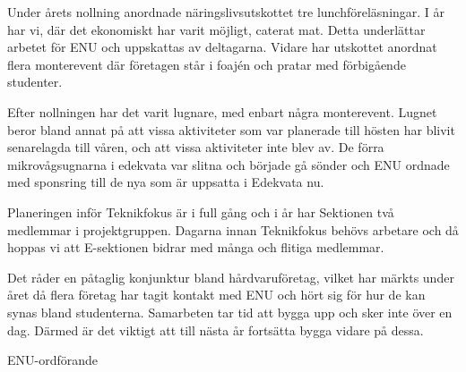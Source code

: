 \documentclass[../_main/handlingar.tex]{subfiles}
\begin{document}

Under årets nollning anordnade näringslivsutskottet tre lunchföreläsningar. I år har vi, där det ekonomiskt har varit möjligt, caterat mat. Detta underlättar arbetet för ENU och uppskattas av deltagarna. Vidare har utskottet anordnat flera monterevent där företagen står i foajén och pratar med förbigående studenter.

Efter nollningen har det varit lugnare, med enbart några monterevent. Lugnet beror bland annat på att vissa aktiviteter som var planerade till hösten har blivit senarelagda till våren, och att vissa aktiviteter inte blev av. De förra mikrovågsugnarna i edekvata var slitna och började gå sönder och ENU ordnade med sponsring till de nya som är uppsatta i Edekvata nu.

Planeringen inför Teknikfokus är i full gång och i år har Sektionen två medlemmar i projektgruppen. Dagarna innan Teknikfokus behövs arbetare och då hoppas vi att E-sektionen bidrar med många och flitiga medlemmar.

Det råder en påtaglig konjunktur bland hårdvaruföretag, vilket har märkts under året då flera företag har tagit kontakt med ENU och hört sig för hur de kan synas bland studenterna. Samarbeten tar tid att bygga upp och sker inte över en dag. Därmed är det viktigt att till nästa år fortsätta bygga vidare på dessa.

\begin{signatures}{1}
    \mvh
    \signature{Johannes Koch}{ENU-ordförande}
\end{signatures}
\end{document}
